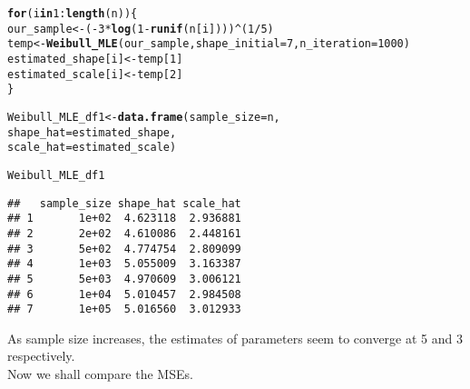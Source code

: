 \documentclass[11pt, a4paper]{article}\usepackage[]{graphicx}\usepackage[]{xcolor}
\makeatletter
\newcommand{\hlnum}[1]{\textcolor[rgb]{0.686,0.059,0.569}{#1}}%
\newcommand{\hlopt}[1]{\textcolor[rgb]{0,0,0}{#1}}%
\newcommand{\hldef}[1]{\textcolor[rgb]{0.345,0.345,0.345}{#1}}%
\newcommand{\hlkwa}[1]{\textcolor[rgb]{0.161,0.373,0.58}{\textbf{#1}}}%
\newcommand{\hlkwb}[1]{\textcolor[rgb]{0.69,0.353,0.396}{#1}}%
\newcommand{\hlkwc}[1]{\textcolor[rgb]{0.333,0.667,0.333}{#1}}%
\newcommand{\hlkwd}[1]{\textcolor[rgb]{0.737,0.353,0.396}{\textbf{#1}}}%
\newenvironment{kframe}{%
 \def\at@end@of@kframe{}%
 \ifinner\ifhmode%
  \def\at@end@of@kframe{\end{minipage}}%
  \begin{minipage}{\columnwidth}%
 \fi\fi%
 \def\FrameCommand##1{\hskip\@totalleftmargin \hskip-\fboxsep
 \colorbox{shadecolor}{##1}\hskip-\fboxsep
     \hskip-\linewidth \hskip-\@totalleftmargin \hskip\columnwidth}%
 \MakeFramed {\advance\hsize-\width
   \@totalleftmargin\z@ \linewidth\hsize
   \@setminipage}}%
 {\par\unskip\endMakeFramed%
 \at@end@of@kframe}
\newenvironment{knitrout}{}{} %
\makeatother
\begin{document}
\begin{knitrout}
\color{fgcolor}\begin{kframe}
\begin{alltt}
\hlkwa{for} \hldef{(i} \hlkwa{in} \hlnum{1}\hlopt{:}\hlkwd{length}\hldef{(n)) \{}
  \hldef{our_sample} \hlkwb{<-} \hldef{(}\hlopt{-} \hlnum{3} \hlopt{*} \hlkwd{log}\hldef{(}\hlnum{1} \hlopt{-} \hlkwd{runif}\hldef{(n[i])))}\hlopt{^}\hldef{(}\hlnum{1}\hlopt{/}\hlnum{5}\hldef{)}
  \hldef{temp} \hlkwb{<-} \hlkwd{Weibull_MLE}\hldef{(our_sample,} \hlkwc{shape_initial} \hldef{=} \hlnum{7}\hldef{,} \hlkwc{n_iteration} \hldef{=} \hlnum{1000}\hldef{)}
  \hldef{estimated_shape[i]} \hlkwb{<-} \hldef{temp[}\hlnum{1}\hldef{]}
  \hldef{estimated_scale[i]} \hlkwb{<-} \hldef{temp[}\hlnum{2}\hldef{]}
\hldef{\}}
\end{alltt}
\end{kframe}
\end{knitrout}

\begin{knitrout}
\color{fgcolor}\begin{kframe}
\begin{alltt}
\hldef{Weibull_MLE_df1} \hlkwb{<-} \hlkwd{data.frame}\hldef{(}\hlkwc{sample_size} \hldef{= n,}
                            \hlkwc{shape_hat} \hldef{= estimated_shape,}
                            \hlkwc{scale_hat} \hldef{= estimated_scale)}
\end{alltt}
\end{kframe}
\end{knitrout}

\begin{knitrout}
\color{fgcolor}\begin{kframe}
\begin{alltt}
\hldef{Weibull_MLE_df1}
\end{alltt}
\begin{verbatim}
##   sample_size shape_hat scale_hat
## 1       1e+02  4.623118  2.936881
## 2       2e+02  4.610086  2.448161
## 3       5e+02  4.774754  2.809099
## 4       1e+03  5.055009  3.163387
## 5       5e+03  4.970609  3.006121
## 6       1e+04  5.010457  2.984508
## 7       1e+05  5.016560  3.012933
\end{verbatim}
\end{kframe}
\end{knitrout}

\smallpencil \hspace{0.1cm} {\setlength{\spaceskip}{1em plus 0.5em minus 0.5em} \fontsize{17}{20}\myfont As sample size increases, the estimates of parameters seem to converge at 5 and 3 respectively. \\

Now we shall compare the MSEs.
\par}
\end{document}
